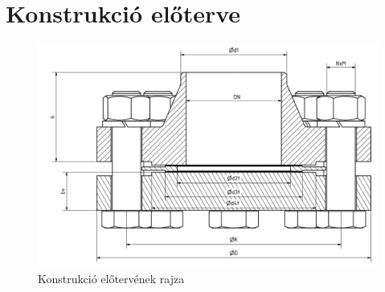 \section{Konstrukció előterve}

\begin{figure}[hbt!]
	\centering
	\includegraphics[scale=.5]{./images/assembly-preplan.png}
	\caption{Konstrukció előtervének rajza}
\end{figure}
